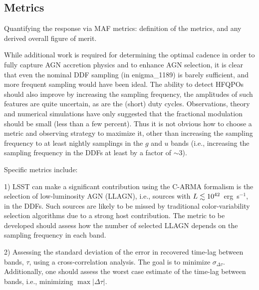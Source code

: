 
\subsection{Metrics}
\label{sec:\secname:metrics}

Quantifying the response via MAF metrics: definition of the metrics,
and any derived overall figure of merit.




While additional work is required for determining the optimal cadence in order
to fully capture AGN accretion physics and to enhance AGN selection, it is clear
that even the nominal DDF sampling (in enigma\_1189) is barely sufficient, and
more frequent sampling would have been ideal. The ability to detect HFQPOs
should also improve by increasing the sampling frequency, the amplitudes of such
features are quite uncertain, as are the (short) duty cycles. Observations,
theory and numerical simulations have only suggested that the fractional
modulation should be small (less than a few percent). Thus it is not obvious how
to choose a metric and observing strategy to maximize it, other than increasing
the sampling frequency to at least nightly samplings in the $g$ and $u$ bands
(i.e., increasing the sampling frequency in the DDFs at least by a factor of
$\sim 3$).

Specific metrics include:

1) LSST can make a significant contribution using
the C-ARMA formalism is the selection of low-luminosity AGN (LLAGN), i.e.,
sources with $L \lesssim 10^{42}$~erg~s$^{-1}$, in the DDFs. Such sources are
likely to be missed by traditional color-variability selection algorithms due to
a strong host contribution. The metric to be developed should assess how the
number of selected LLAGN depends on the sampling frequency in each band.

2) Assessing the standard deviation of the error in recovered time-lag between
bands, $\tau$, using a cross-correlation analysis. The goal is to minimize
$\sigma_{\Delta \tau}$. Additionally, one should assess the worst case estimate of
the time-lag between bands, i.e., minimizing $\max \vert \Delta \tau \vert$.

